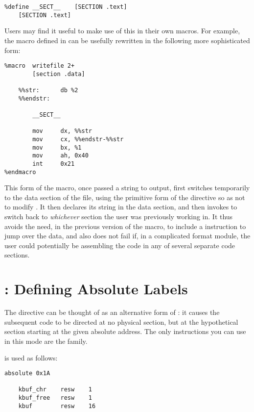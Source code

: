 \begin{lstlisting}
%define __SECT__    [SECTION .text]
    [SECTION .text]
\end{lstlisting}

Users may find it useful to make use of this in their own macros.
For example, the  macro defined in 
can be usefully rewritten in the following more sophisticated form:

\begin{lstlisting}
%macro  writefile 2+
        [section .data]

    %%str:      db %2
    %%endstr:

        __SECT__

        mov     dx, %%str
        mov     cx, %%endstr-%%str
        mov     bx, %1
        mov     ah, 0x40
        int     0x21
%endmacro
\end{lstlisting}

This form of the macro, once passed a string to output, first
switches temporarily to the data section of the file, using the
primitive form of the  directive so as not to modify
. It then declares its string in the data section,
and then invokes  to switch back to \emph{whichever}
section the user was previously working in. It thus avoids the need,
in the previous version of the macro, to include a  instruction
to jump over the data, and also does not fail if, in a complicated
 format module, the user could potentially be assembling the
code in any of several separate code sections.

\section{: Defining Absolute Labels}
\label{subsec:absolute}

The  directive can be thought of as an alternative form
of : it causes the subsequent code to be directed at no
physical section, but at the hypothetical section starting at the
given absolute address. The only instructions you can use in this
mode are the  family.

 is used as follows:

\begin{lstlisting}
absolute 0x1A

    kbuf_chr    resw    1
    kbuf_free   resw    1
    kbuf        resw    16
\end{lstlisting}

